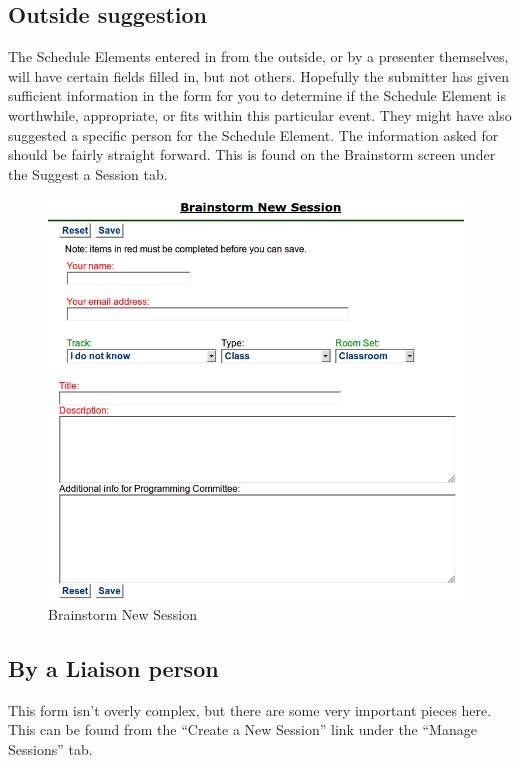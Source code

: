 \documentclass[tablesignature]{scrartcl}
\begin{document}
\subsection{Outside suggestion}
\label{sec-5_1}

   
   The Schedule Elements entered in from the outside, or by a
   presenter themselves, will have certain fields filled in, but not
   others.  Hopefully the submitter has given sufficient information
   in the form for you to determine if the Schedule Element is
   worthwhile, appropriate, or fits within this particular event.
   They might have also suggested a specific person for the Schedule
   Element.  The information asked for should be fairly
   straight forward. This is found on the Brainstorm screen under the
   Suggest a Session tab.

\begin{figure}[H]
\centering
\includegraphics[width=0.98\textwidth]{./Images/Brainstorm_New_Session.png}
\caption{\label{fig:Zambia_Presenter_Flow_Brainstorm New Session}Brainstorm New Session}
\end{figure}
   
\subsection{By a Liaison person}
\label{sec-5_2}


   This form isn't overly complex, but there are some very important
   pieces here.  This can be found from the ``Create a New Session''
   link under the ``Manage Sessions'' tab.
\end{document}
